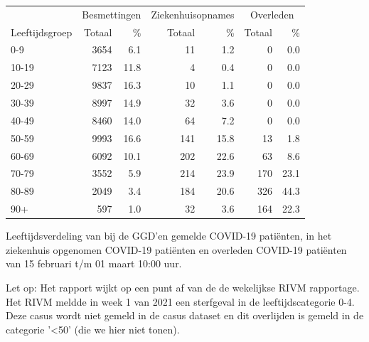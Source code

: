 \documentclass[
  english,
  man,floatsintext]{apa6}
\begin{document}
\begin{table}
\centering\begingroup\fontsize{11}{13}\selectfont

\begin{threeparttable}
\begin{tabular}{lrrrrrr}
\toprule
\multicolumn{1}{c}{ } & \multicolumn{2}{c}{Besmettingen} & \multicolumn{2}{c}{Ziekenhuisopnames} & \multicolumn{2}{c}{Overleden} \\
\cmidrule(l{3pt}r{3pt}){2-3} \cmidrule(l{3pt}r{3pt}){4-5} \cmidrule(l{3pt}r{3pt}){6-7}
Leeftijdsgroep & Totaal & \% & Totaal & \% & Totaal & \%\\
\midrule
0-9 & 3654 & 6.1 & 11 & 1.2 & 0 & 0.0\\
10-19 & 7123 & 11.8 & 4 & 0.4 & 0 & 0.0\\
20-29 & 9837 & 16.3 & 10 & 1.1 & 0 & 0.0\\
30-39 & 8997 & 14.9 & 32 & 3.6 & 0 & 0.0\\
40-49 & 8460 & 14.0 & 64 & 7.2 & 0 & 0.0\\
50-59 & 9993 & 16.6 & 141 & 15.8 & 13 & 1.8\\
60-69 & 6092 & 10.1 & 202 & 22.6 & 63 & 8.6\\
70-79 & 3552 & 5.9 & 214 & 23.9 & 170 & 23.1\\
80-89 & 2049 & 3.4 & 184 & 20.6 & 326 & 44.3\\
90+ & 597 & 1.0 & 32 & 3.6 & 164 & 22.3\\
\bottomrule
\end{tabular}
\begin{tablenotes}
\item[1] Leeftijdsverdeling van bij de GGD’en gemelde COVID-19 patiënten, in het ziekenhuis opgenomen COVID-19 patiënten en overleden COVID-19 patiënten van 15 februari t/m 01 maart 10:00 uur.
\item[2] Let op: Het rapport wijkt op een punt af van de de wekelijkse RIVM rapportage. Het RIVM meldde in week 1 van 2021 een sterfgeval in de leeftijdscategorie 0-4. Deze casus wordt niet gemeld in de casus dataset en dit overlijden is gemeld in de categorie '<50' (die we hier niet tonen).
\end{tablenotes}
\end{threeparttable}
\endgroup{}
\end{table}

\newpage
\end{document}
